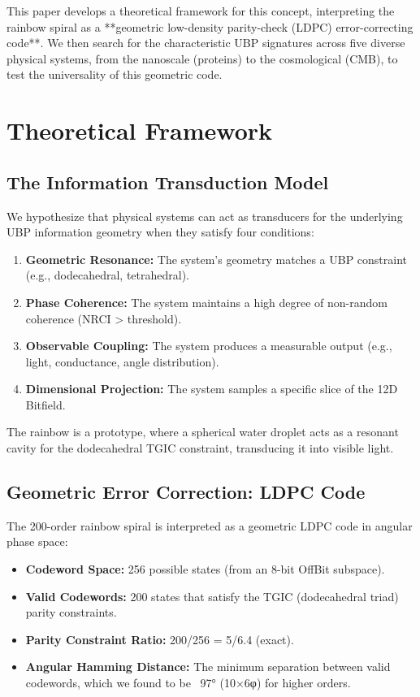 \documentclass[12pt]{article}
\begin{document}
This paper develops a theoretical framework for this concept, interpreting the rainbow spiral as a **geometric low-density parity-check (LDPC) error-correcting code**. We then search for the characteristic UBP signatures across five diverse physical systems, from the nanoscale (proteins) to the cosmological (CMB), to test the universality of this geometric code.

\section{Theoretical Framework}

\subsection{The Information Transduction Model}
We hypothesize that physical systems can act as transducers for the underlying UBP information geometry when they satisfy four conditions:
\begin{enumerate}
    \item \textbf{Geometric Resonance:} The system's geometry matches a UBP constraint (e.g., dodecahedral, tetrahedral).
    \item \textbf{Phase Coherence:} The system maintains a high degree of non-random coherence (NRCI > threshold).
    \item \textbf{Observable Coupling:} The system produces a measurable output (e.g., light, conductance, angle distribution).
    \item \textbf{Dimensional Projection:} The system samples a specific slice of the 12D Bitfield.
\end{enumerate}

The rainbow is a prototype, where a spherical water droplet acts as a resonant cavity for the dodecahedral TGIC constraint, transducing it into visible light.

\subsection{Geometric Error Correction: LDPC Code}
The 200-order rainbow spiral is interpreted as a geometric LDPC code in angular phase space:
\begin{itemize}
    \item \textbf{Codeword Space:} 256 possible states (from an 8-bit OffBit subspace).
    \item \textbf{Valid Codewords:} 200 states that satisfy the TGIC (dodecahedral triad) parity constraints.
    \item \textbf{Parity Constraint Ratio:} 200/256 = 5/6.4 (exact).
    \item \textbf{Angular Hamming Distance:} The minimum separation between valid codewords, which we found to be ~97° (10×6φ) for higher orders.
\end{itemize}
\end{document}
